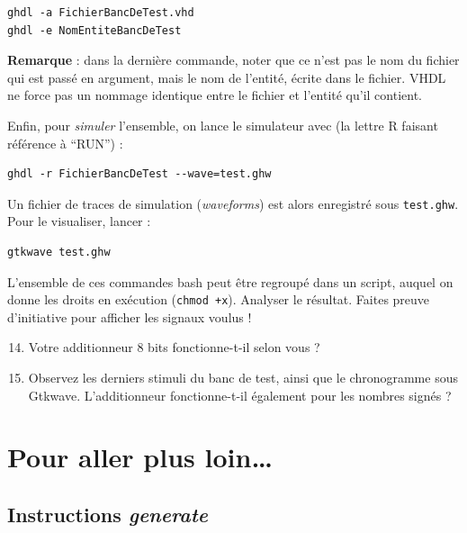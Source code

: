 \documentclass[a4paper,11pt]{article}
\begin{document}
\begin{lstlisting}[style=bashstyle]
ghdl -a FichierBancDeTest.vhd
ghdl -e NomEntiteBancDeTest
\end{lstlisting}

\textbf{Remarque} : dans la dernière commande, noter que ce n'est pas le nom du fichier qui est passé en argument, mais le nom de l'entité, écrite dans le fichier. VHDL ne force pas un nommage identique entre le fichier et l'entité qu'il contient.

Enfin, pour \textit{simuler} l'ensemble, on lance le simulateur avec (la lettre R faisant référence à ``RUN'') :

\begin{lstlisting}[style=bashstyle]
ghdl -r FichierBancDeTest --wave=test.ghw
\end{lstlisting}

Un fichier de traces de simulation (\textit{waveforms}) est alors enregistré sous \texttt{test.ghw}. Pour le visualiser, lancer :

\begin{lstlisting}[style=bashstyle]
gtkwave test.ghw
\end{lstlisting}

L'ensemble de ces commandes bash peut être regroupé dans un script, auquel on donne les droits en exécution (\texttt{chmod +x}). Analyser le résultat. Faites preuve d'initiative pour afficher les signaux voulus !

\begin{questionbox}
\begin{enumerate}
    \setcounter{enumi}{13}
    \item Votre additionneur 8 bits fonctionne-t-il selon vous ?
    \item Observez les derniers stimuli du banc de test, ainsi que le chronogramme sous Gtkwave. L'additionneur fonctionne-t-il également pour les nombres signés ?
\end{enumerate}
\end{questionbox}

\section{Pour aller plus loin\ldots}

\subsection*{Instructions \textit{generate}}
\end{document}
